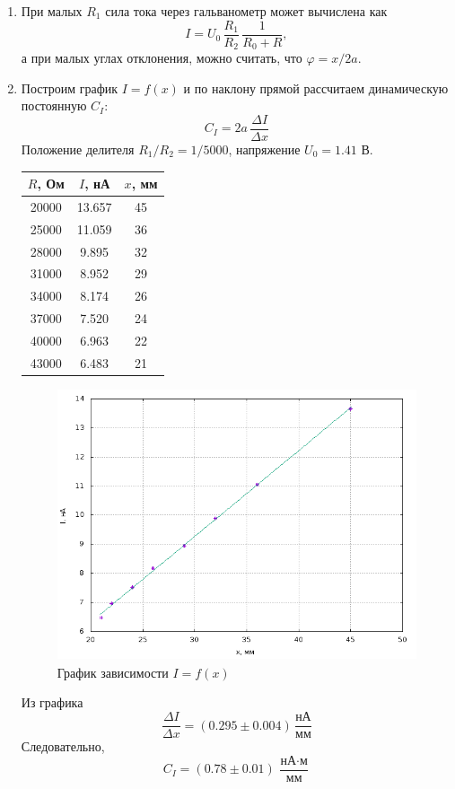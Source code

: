 \documentclass[12pt]{article}
\begin{document}
\begin{enumerate}
	\item
		При  малых $R_1$ сила тока через гальванометр может вычислена как
		\[
			I = U_0 \, \frac{R_1}{R_2}\,\frac{1}{R_0 + R},
		\]
		а при малых углах отклонения, можно считать, что $\varphi = x / 2a$.
	\item
		Построим график $I = f(x)$ и по наклону прямой рассчитаем динамическую постоянную $C_I$:
		\[
			C_I = 2a\, \frac{\Delta I}{\Delta x}
		\]
		Положение делителя $R_1 / R_2 = 1 / 5000$, напряжение $U_0 = 1.41$ В.
        \newpage		
		\begin{table}[h!]
			\centering
			\begin{tabular}{|c|c|c|}
			\hline
			$R$, Ом & $I$, нА & $x$, мм \\
			\hline
			20000 & 13.657 & 45 \\
			\hline
			25000 & 11.059 & 36 \\
			\hline
			28000 & 9.895 & 32 \\
			\hline
			31000 & 8.952 & 29 \\
			\hline
			34000 & 8.174 & 26 \\
			\hline
			37000 & 7.520 & 24 \\
			\hline
            40000 & 6.963 & 22 \\
            \hline
            43000 & 6.483 & 21 \\			
			\hline
			\end{tabular}
		\end{table}				
		\begin{figure}[h!]
			\centering
			\includegraphics[width = 15cm, height = 8cm]{plot3.png}
			\caption{График зависимости $I = f(x)$}
		\end{figure}
	    Из графика
	    \[
	    	\frac{\Delta I}{\Delta x} = \left(0.295 \pm 0.004\right) \, \frac{\text{нА}}{\text{мм}}
	    \]
	    Следовательно, 
	    \[
	    	C_I = \left(0.78 \pm 0.01 \right) \, \frac{\text{нА} \cdot \text{м}}{\text{мм}}
	    \]				
\end{enumerate}
\end{document}
